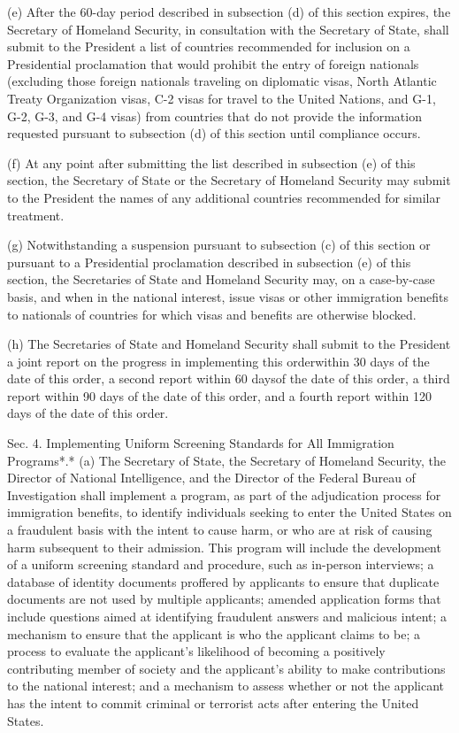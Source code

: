 (e) After the 60-day period described in subsection (d) of this section
expires, the Secretary of Homeland Security, in consultation with the
Secretary of State, shall submit to the President a list of countries
recommended for inclusion on a Presidential proclamation that would
prohibit the entry of foreign nationals (excluding those foreign
nationals traveling on diplomatic visas, North Atlantic Treaty
Organization visas, C-2 visas for travel to the United Nations, and G-1,
G-2, G-3, and G-4 visas) from countries that do not provide the
information requested pursuant to subsection (d) of this section until
compliance occurs.

(f) At any point after submitting the list described in subsection (e)
of this section, the Secretary of State or the Secretary of Homeland
Security may submit to the President the names of any additional
countries recommended for similar treatment.

(g) Notwithstanding a suspension pursuant to subsection (c) of this
section or pursuant to a Presidential proclamation described in
subsection (e) of this section, the Secretaries of State and Homeland
Security may, on a case-by-case basis, and when in the national
interest, issue visas or other immigration benefits to nationals of
countries for which visas and benefits are otherwise blocked.

(h) The Secretaries of State and Homeland Security shall submit to the
President a joint report on the progress in implementing this
orderwithin 30 days of the date of this order, a second report within 60
daysof the date of this order, a third report within 90 days of the date
of this order, and a fourth report within 120 days of the date of this
order.

Sec. 4. Implementing Uniform Screening Standards for All Immigration
Programs*.* (a) The Secretary of State, the Secretary of Homeland
Security, the Director of National Intelligence, and the Director of the
Federal Bureau of Investigation shall implement a program, as part of
the adjudication process for immigration benefits, to identify
individuals seeking to enter the United States on a fraudulent basis
with the intent to cause harm, or who are at risk of causing harm
subsequent to their admission. This program will include the development
of a uniform screening standard and procedure, such as in-person
interviews; a database of identity documents proffered by applicants to
ensure that duplicate documents are not used by multiple applicants;
amended application forms that include questions aimed at identifying
fraudulent answers and malicious intent; a mechanism to ensure that the
applicant is who the applicant claims to be; a process to evaluate the
applicant's likelihood of becoming a positively contributing member of
society and the applicant's ability to make contributions to the
national interest; and a mechanism to assess whether or not the
applicant has the intent to commit criminal or terrorist acts after
entering the United States.

